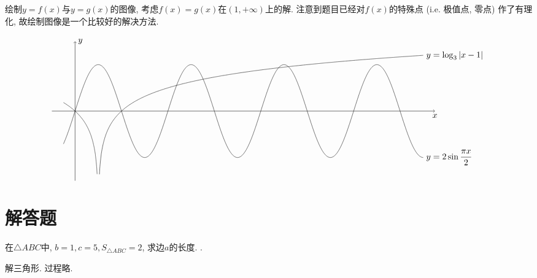 \documentclass[8pt]{article}
\begin{document}
		绘制\(y=f(x)\)与\(y=g(x)\)的图像, 考虑$f(x) = g(x)$在$(1, +\infty)$上的解. 注意到题目已经对$f(x)$的特殊点 (i.e. 极值点, 零点) 作了有理化, 故绘制图像是一个比较好的解决方法.

		\[
			\begin{tikzpicture}[scale = 0.95, baseline = 0]
				\draw[black, ->] (-1, 0)--(15.5, 0) node[below] {\(x\)};
				\draw[black, ->] (0, -3)--(0, 3) node[right] {\(y\)};
				\draw[black, domain = -0.5 : 15, samples = 2000] plot(\x, {2 * sin(deg(pi * \x / 2))}) node[right] {\(y=2\sin\dfrac{\pi x}{2}\)};
				\draw[black, domain = -0.5 : 0.95, samples = 2000] plot(\x, {ln(1 - \x) / ln(3)});
				\draw[black, domain = 1.05 : 15, samples = 2000] plot(\x, {ln(\x - 1) / ln(3)}) node[right] {\(y=\log_{3}\abs{x-1}\)};
			\end{tikzpicture}
		\]

	\section{解答题}

		在\(\triangle ABC\)中, \(b=1, c=5, S_{\triangle ABC}=2\), 求边\(a\)的长度. .

		解三角形. 过程略.
		~\\
\end{document}
